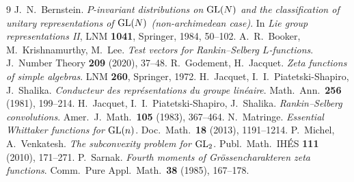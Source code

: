 \begin{thebibliography}{9}
 J.~N.~Bernstein.
  \emph{$P$-invariant distributions on $\mathrm{GL}(N)$ and the classification of
  unitary representations of $\mathrm{GL}(N)$ (non-archimedean case)}. In
  \emph{Lie group representations II}, LNM \textbf{1041}, Springer, 1984,
  50--102.
 A.~R.~Booker, M.~Krishnamurthy, M.~Lee.
  \emph{Test vectors for Rankin--Selberg $L$-functions}.
  J.\ Number Theory \textbf{209} (2020), 37--48.
 R.~Godement, H.~Jacquet.
  \emph{Zeta functions of simple algebras}. LNM \textbf{260}, Springer, 1972.
 H.~Jacquet, I.~I.~Piatetski-Shapiro, J.~Shalika.
  \emph{Conducteur des repr\'esentations du groupe lin\'eaire}.
  Math.\ Ann.\ \textbf{256} (1981), 199--214.
 H.~Jacquet, I.~I.~Piatetski-Shapiro, J.~Shalika.
  \emph{Rankin--Selberg convolutions}.
  Amer.\ J.\ Math.\ \textbf{105} (1983), 367--464.
 N.~Matringe.
  \emph{Essential Whittaker functions for $\mathrm{GL}(n)$}.
  Doc.\ Math.\ \textbf{18} (2013), 1191--1214.
 P.~Michel, A.~Venkatesh.
  \emph{The subconvexity problem for $\mathrm{GL}_2$}.
  Publ.\ Math.\ IH\'ES \textbf{111} (2010), 171--271.
 P.~Sarnak.
  \emph{Fourth moments of Gr\"ossencharakteren zeta functions}.
  Comm.\ Pure Appl.\ Math.\ \textbf{38} (1985), 167--178.
\end{thebibliography}

\endgroup
